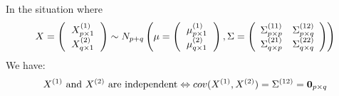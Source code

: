 \documentclass[12pt]{extarticle}
\newcommand{\<}{\langle}
\renewcommand{\>}{\rangle}
\theoremstyle{definition}
\begin{document}
\begin{tcolorbox}[enhanced, drop fuzzy shadow, title=Partition and independence]
In the situation where
\begin{eqnarray*}
X=
\left( \begin{tabular}{l} 
        $X^{(1)}_{p \times 1}$\\ 
        $X^{(2)}_{q \times 1}$
        \end{tabular}\right)
\sim N_{p+q} \left(
        \mu = \left( \begin{tabular}{l} 
            $\mu^{(1)}_{p \times 1}$\\ 
            $\mu^{(2)}_{q \times 1}$
        \end{tabular}\right),
        \Sigma = \left(\begin{array}{cc}
            \Sigma^{(11)}_{p \times p} & \Sigma^{(12)}_{p \times q} \\
            \Sigma^{(21)}_{q \times p} & \Sigma^{(22)}_{q \times q}
        \end{array} \right)
    \right)
\end{eqnarray*}
We have: \\
\begin{eqnarray*}
\text{$X^{(1)}$ and $X^{(2)}$ are independent} \Leftrightarrow cov(X^{(1)},X^{(2)}) = \Sigma^{(12)} = {\bf 0}_{p \times q}
\end{eqnarray*}
\end{tcolorbox}
\end{document}
